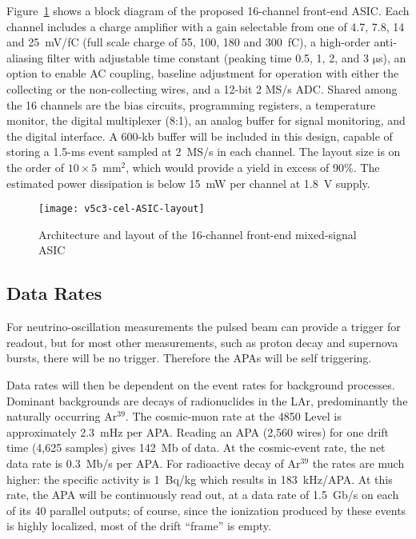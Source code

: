 Figure~\ref{fig:ce-elec-asic-layout} shows a block diagram of the proposed 16-channel front-end ASIC.
Each channel includes a charge amplifier with a gain selectable from one of 4.7, 7.8, 14 and 25~mV/fC
(full scale charge of 55, 100, 180 and 300~fC),
a high-order anti-aliasing filter with adjustable time
constant (peaking time 0.5, 1, 2, and 3 $\mathrm{\mu}$s),
an option to enable AC coupling,
baseline adjustment for operation with either the collecting or the non-collecting wires,
and a 12-bit 2 MS/s ADC.
Shared among the 16 channels are the bias circuits, programming registers,
a temperature monitor, the digital multiplexer (8:1),
an analog buffer for signal monitoring, and the digital interface.
A 600-kb buffer will be included in this design, capable of storing a 1.5-ms 
event sampled at 2~MS/s in each channel.
The layout size is on the order of $10 \times 5$~mm${^2}$, which would provide a yield in excess of 90\%.
The estimated power dissipation is below 15~mW per channel at 1.8~V supply.

\begin{figure}[htbp]
\centering
\texttt{[image: v5c3-cel-ASIC-layout]}
\caption{Architecture and layout of the 16-channel front-end mixed-signal ASIC}
\label{fig:ce-elec-asic-layout}
\end{figure}

\subsection{Data Rates}

For neutrino-oscillation measurements the pulsed beam can provide a
trigger for readout, but for most other measurements, such as proton decay
and supernova bursts, there will be no trigger.  Therefore the APAs will be
self triggering.  

Data rates will then
be dependent on the event rates for background processes.  Dominant
backgrounds are decays of radionuclides in the LAr,
predominantly the naturally occurring Ar$^{39}$.  The cosmic-muon rate at the 4850 Level is approximately 2.3~mHz per APA.  Reading an APA (2,560 wires) for
one drift time (4,625 samples) gives 142~Mb of data. At the cosmic-event rate,
the net data rate is 0.3~Mb/s per APA.  For radioactive decay of Ar$^{39}$
the rates are much higher: the specific activity is 1~Bq/kg which results in 183~kHz/APA.
At this rate, the APA will be continuously read out,
at a data rate of 1.5~Gb/s on each of its 40 parallel outputs;
of course, since the ionization produced by these events is highly localized,
most of the drift ``frame'' is empty.

